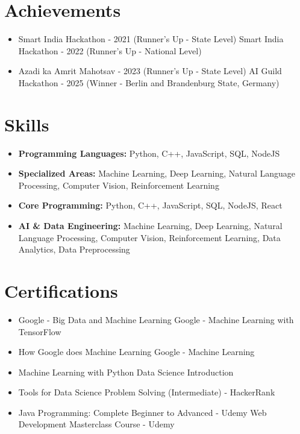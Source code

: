 \documentclass[a4paper,10pt]{article}
\begin{document}
\section*{Achievements}
\begin{itemize}
\item Smart India Hackathon - 2021 (Runner's Up - State Level) \hfill Smart India Hackathon - 2022 (Runner's Up - National Level)
\item Azadi ka Amrit Mahotsav - 2023 (Runner's Up - State Level) \hfill AI Guild Hackathon - 2025 (Winner - Berlin and Brandenburg State, Germany)
\end{itemize}

\section*{Skills}
\begin{itemize}
  \item \textbf{Programming Languages:} Python, C++, JavaScript, SQL, NodeJS
  \item \textbf{Specialized Areas:} Machine Learning, Deep Learning, Natural Language Processing, Computer Vision, Reinforcement Learning
  \item \textbf{Core Programming:} Python, C++, JavaScript, SQL, NodeJS, React
  \item \textbf{AI \& Data Engineering:} Machine Learning, Deep Learning, Natural Language Processing, Computer Vision, Reinforcement Learning, Data Analytics, Data Preprocessing
\end{itemize}

\section*{Certifications}
\begin{itemize}
\item Google - Big Data and Machine Learning \hfill Google - Machine Learning with TensorFlow
\item How Google does Machine Learning \hfill Google - Machine Learning
\item Machine Learning with Python \hfill Data Science Introduction
\item Tools for Data Science \hfill Problem Solving (Intermediate) - HackerRank
\item Java Programming: Complete Beginner to Advanced - Udemy \hfill Web Development Masterclass Course - Udemy
\end{itemize}
\end{document}
